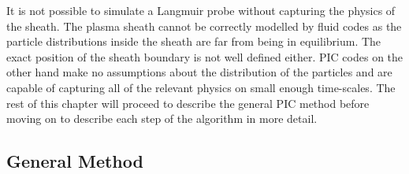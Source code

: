 It is not possible to simulate a Langmuir probe without capturing the physics of the sheath. The plasma sheath cannot be correctly modelled by fluid codes as the particle distributions inside the sheath are far from being in equilibrium. The exact position of the sheath boundary is not well defined either. PIC codes on the other hand make no assumptions about the distribution of the particles and are capable of capturing all of the relevant physics on small enough time-scales. The rest of this chapter will proceed to describe the general PIC method before moving on to describe each step of the algorithm in more detail. 



\subsection{General Method} 

